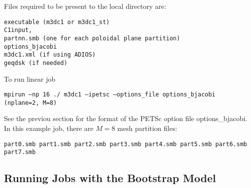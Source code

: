 \noindent
Files required to be present to the local directory are:
\begin{verbatim}
executable (m3dc1 or m3dc1_st)
C1input,
partnn.smb (one for each poloidal plane partition)
options_bjacobi
m3dc1.xml (if using ADIOS)
geqdsk (if needed)
\end{verbatim}

\noindent
To run linear job
\begin{verbatim}
mpirun –np 16 ./ m3dc1 –ipetsc –options_file options_bjacobi (nplane=2, M=8)
\end{verbatim}
\noindent
See the previou section for the format of the PETSc option file options\_bjacobi. In this example job, there are $M=8$ mesh partition files:
\begin{verbatim}
part0.smb part1.smb part2.smb part3.smb part4.smb part5.smb part6.smb part7.smb
\end{verbatim}

\subsection{Running Jobs with the Bootstrap Model}


